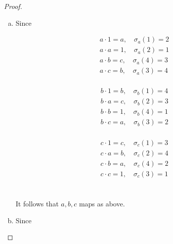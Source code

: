 \documentclass{article}
\begin{document}
\begin{proof}
    \begin{enumerate}[(a)]
        \item Since \hspace{0.1cm}\\
        \begin{minipage}{0.33\linewidth}
            

        \begin{align*}
            a \cdot 1 =a, \quad \sigma_a(1)=2\\
            a \cdot a = 1, \quad \sigma_a (2)=1\\
            a \cdot b = c, \quad \sigma_a (4)=3\\
            a \cdot c = b, \quad \sigma_a (3)=4\\
        \end{align*}
                \end{minipage}
                \begin{minipage}{0.33\linewidth}
                    

            \begin{align*}
            b \cdot 1 =b, \quad \sigma_b(1)=4\\
            b \cdot a = c, \quad \sigma_b (2)=3\\
            b \cdot b = 1, \quad \sigma_b (4)=1\\
            b \cdot c = a, \quad \sigma_b (3)=2\\
        \end{align*}                \end{minipage}
        \begin{minipage}{0.33\linewidth}
                    

            \begin{align*}
            c \cdot 1 =c, \quad \sigma_c(1)=3\\
            c \cdot a = b, \quad \sigma_c (2)=4\\
            c \cdot b = a, \quad \sigma_c(4)=2\\
            c \cdot c = 1, \quad \sigma_c (3)=1\\
        \end{align*}                \end{minipage}\\
        It follows that $a, b, c$ maps as above.
        \item Since \hspace{0.1cm}\\
        \begin{minipage}{0.33\linewidth}
            


\end{minipage}
\end{enumerate}
\end{proof}
\end{document}
